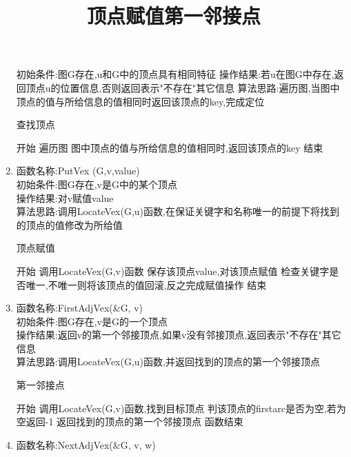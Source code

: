 \documentclass[supercite]{HustGraduPaper}
\theoremstyle{definition}
\begin{document}
\begin{enumerate}
	      初始条件:图G存在,u和G中的顶点具有相同特征
	      操作结果:若u在图G中存在,返回顶点u的位置信息,否则返回表示"不存在"其它信息
	      算法思路:遍历图,当图中顶点的值与所给信息的值相同时返回该顶点的key,完成定位
	      \begin{algorithm}[htb]
		      \caption{查找顶点}
		      \begin{algorithmic}[1]
			      \State 开始
			      \State 遍历图
			      \State 图中顶点的值与所给信息的值相同时,返回该顶点的key
			      \State 结束
		      \end{algorithmic}\label{G3}
	      \end{algorithm}
	\item 函数名称:PutVex (G,v,value)\\
	      初始条件:图G存在,v是G中的某个顶点\\
	      操作结果:对v赋值value\\
	      算法思路:调用LocateVex(G,u)函数,在保证关键字和名称唯一的前提下将找到的顶点的值修改为所给值
	      \begin{algorithm}[htb]
		      \title{顶点赋值}
		      \caption{顶点赋值}
		      \begin{algorithmic}[1]
			      \State 开始
			      \State 调用LocateVex(G,v)函数
			      \State 保存该顶点value,对该顶点赋值
			      \State 检查关键字是否唯一,不唯一则将该顶点的值回滚,反之完成赋值操作
			      \State 结束
		      \end{algorithmic}\label{G4}
	      \end{algorithm}
	\item 函数名称:FirstAdjVex(\&G, v)\\
	      初始条件:图G存在,v是G的一个顶点\\
	      操作结果:返回v的第一个邻接顶点,如果v没有邻接顶点,返回表示"不存在"其它信息\\
	      算法思路:调用LocateVex(G,u)函数,并返回找到的顶点的第一个邻接顶点
	      \newpage
	      \begin{algorithm}[htb]
		      \title{第一邻接点}
		      \caption{第一邻接点}
		      \begin{algorithmic}[1]
			      \State 开始
			      \State 调用LocateVex(G,v)函数,找到目标顶点
			      \State 判该顶点的firstarc是否为空,若为空返回-1
			      \State 返回找到的顶点的第一个邻接顶点
			      \State 函数结束
		      \end{algorithmic}\label{G5}
	      \end{algorithm}
	\item 函数名称:NextAdjVex(\&G, v, w)\\

\end{enumerate}
\end{document}
